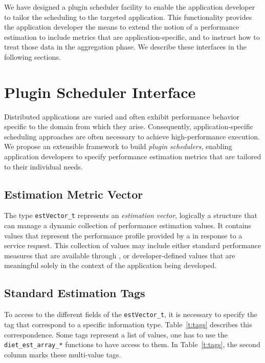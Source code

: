 We have designed a plugin scheduler facility to enable the application
developer to tailor the \diet scheduling to the targeted application. This
functionality provides the application developer the means to extend the notion
of a performance estimation to include metrics that are application-specific,
and to instruct \diet how to treat those data in the aggregation phase.  We
describe these interfaces in the following sections.


\section{Plugin Scheduler Interface}

Distributed applications are varied and often exhibit performance behavior
specific to the domain from which they arise. Consequently,
application-specific scheduling approaches are often necessary to achieve
high-performance execution. We propose an extensible framework to build
\emph{plugin schedulers}, enabling application developers to specify
performance estimation metrics that are tailored to their individual needs.


\subsection{Estimation Metric Vector}\label{sect:estvector}

The type \texttt{estVector\_t} represents an \emph{estimation vector},
logically a structure that can manage a dynamic collection of performance
estimation values. It contains values that represent the performance profile
provided by a {\sed} in response to a \diet service request. This collection of
values may include either standard performance measures that are available
through \diet, or developer-defined values that are meaningful solely in the
context of the application being developed.

\subsection{Standard Estimation Tags}\label{sect:estTags}

To access to the different fields of the \texttt{estVector\_t}, it is necessary
to specify the tag that correspond to a specific information type.
Table~\ref{t:tags} describes this correspondence. Some tags represent a list of
values, one has to use the \texttt{diet\_est\_array\_*} functions to have
access to them. In Table~\ref{t:tags},  the second column marks these
multi-value tags.

